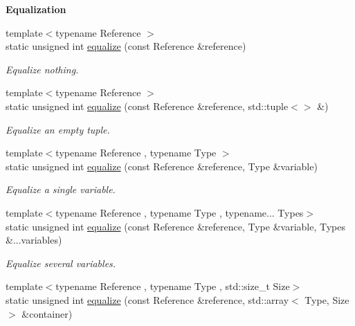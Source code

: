 \begin{Indent}{\bf Equalization}\par
\begin{DoxyCompactItemize}
\item 
{\footnotesize template$<$typename Reference $>$ }\\static unsigned int \hyperlink{exceptionmagrathea_1_1DataHandler_a51a6cff6e8a684d22e368ff56ca72fea}{equalize} (const Reference \&reference)
\begin{DoxyCompactList}\small\item\em Equalize nothing. \end{DoxyCompactList}\item 
{\footnotesize template$<$typename Reference $>$ }\\static unsigned int \hyperlink{exceptionmagrathea_1_1DataHandler_a73254d7cfb56f9d49207670ce2f0bf46}{equalize} (const Reference \&reference, std\-::tuple$<$$>$ \&)
\begin{DoxyCompactList}\small\item\em Equalize an empty tuple. \end{DoxyCompactList}\item 
{\footnotesize template$<$typename Reference , typename Type $>$ }\\static unsigned int \hyperlink{exceptionmagrathea_1_1DataHandler_a21aa49476bfdea5e3e1eb6db89610b6f}{equalize} (const Reference \&reference, Type \&variable)
\begin{DoxyCompactList}\small\item\em Equalize a single variable. \end{DoxyCompactList}\item 
{\footnotesize template$<$typename Reference , typename Type , typename... Types$>$ }\\static unsigned int \hyperlink{exceptionmagrathea_1_1DataHandler_ac30aa6d5b117ee5af179dba30b59025f}{equalize} (const Reference \&reference, Type \&variable, Types \&...variables)
\begin{DoxyCompactList}\small\item\em Equalize several variables. \end{DoxyCompactList}\item 
{\footnotesize template$<$typename Reference , typename Type , std\-::size\-\_\-t Size$>$ }\\static unsigned int \hyperlink{exceptionmagrathea_1_1DataHandler_a91eaaf11ba2d7d2c56cb365b1f4fae05}{equalize} (const Reference \&reference, std\-::array$<$ Type, Size $>$ \&container)
$$
\end{DoxyCompactItemize}
\end{Indent}

